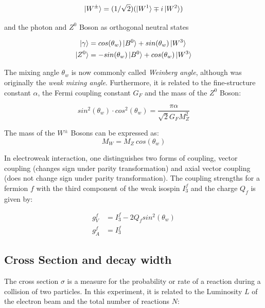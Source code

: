 \begin{equation}
\ket{W^{\pm}}=(1/\sqrt{2}) (\ket{W^1}\mp i\ket{W^2})
\end{equation}

and the photon and $Z^0$ Boson as orthogonal neutral states\cite{Grif}

\begin{equation}
\begin{aligned}
\ket{\gamma} &=  cos(\theta_w)\ket{B^0} + sin(\theta_w) \ket{W^3}\\
\ket{Z^0} &= -sin(\theta_w) \ket{B^0} + cos(\theta_w) \ket{W^3}
\end{aligned}
\end{equation}

The mixing angle $\theta_w$ is now commonly called \emph{Weinberg angle}, although was originally the \emph{weak mixing angle}. Furthermore, it is related to the fine-structure constant  $\alpha$, the Fermi coupling constant $G_F$ and the mass of the $Z^0$ Boson\cite{muenchen}:

\begin{equation}
sin^2(\theta_w)\cdot cos^2(\theta_w) = \frac{\pi\alpha}{\sqrt{2}G_FM_Z^2}
\end{equation}

The mass of the $W^{\pm}$ Bosons can be expressed as:
\begin{equation}
M_W = M_Z~cos(\theta_w)
\end{equation}

In electroweak interaction, one distinguishes two forms of coupling, vector coupling (changes sign under parity transformation) and axial vector coupling (does not change sign under parity transformation). The coupling strengths for a fermion $f$ with the third component of the weak isospin $I^f_3$ and the charge $Q_f$ is given by\cite{muenchen}:

\begin{equation}
\begin{aligned}
g_V^f &= I^f_3-2 Q_f sin^2(\theta_w)\\
g_A^f &= I^f_3
\end{aligned}
\label{eq:principles:coupling strengths}
\end{equation}

\subsection{Cross Section and decay width}
The cross section $\sigma$ is a measure for the probability or rate of a reaction during a collision of two particles. In this experiment, it is related to the Luminosity $L$ of the electron beam and the total number of reactions $N$:


